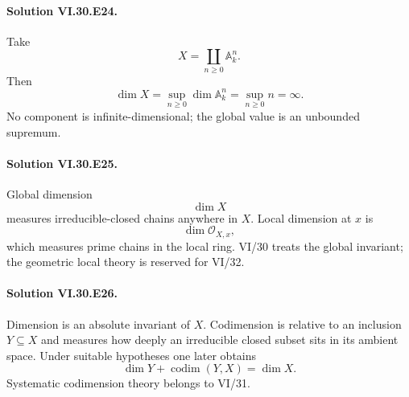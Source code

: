 \paragraph{Solution VI.30.E24.}
Take
\[
X=\coprod_{n\ge0}\mathbb A^n_k.
\]
Then
\[
\dim X=\sup_{n\ge0}\dim\mathbb A^n_k=\sup_{n\ge0}n=\boxed{\infty}.
\]
No component is infinite-dimensional; the global value is an unbounded supremum.

\paragraph{Solution VI.30.E25.}
Global dimension
\[
\dim X
\]
measures irreducible-closed chains anywhere in \(X\). Local dimension at \(x\) is
\[
\dim\mathcal O_{X,x},
\]
which measures prime chains in the local ring. VI/30 treats the global invariant; the geometric local theory is
reserved for VI/32.

\paragraph{Solution VI.30.E26.}
Dimension is an absolute invariant of \(X\). Codimension is relative to an inclusion \(Y\subseteq X\) and measures
how deeply an irreducible closed subset sits in its ambient space. Under suitable hypotheses one later obtains
\[
\dim Y+\operatorname{codim}(Y,X)=\dim X.
\]
Systematic codimension theory belongs to VI/31.
